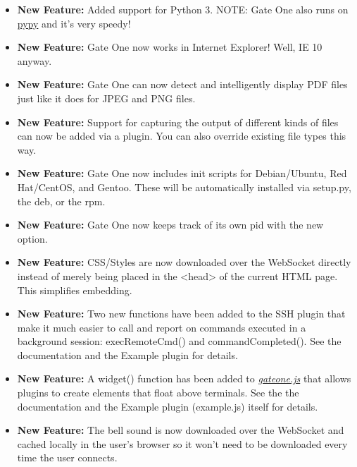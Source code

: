 \documentclass[letterpaper,10pt,openany]{sphinxmanual}
\begin{document}
\begin{itemize}
\item {} 
\textbf{New Feature:}  Added support for Python 3.  NOTE:  Gate One also runs on \href{http://pypy.org/}{pypy} and it's very speedy!

\item {} 
\textbf{New Feature:}  Gate One now works in Internet Explorer!  Well, IE 10 anyway.

\item {} 
\textbf{New Feature:}  Gate One can now detect and intelligently display PDF files just like it does for JPEG and PNG files.

\item {} 
\textbf{New Feature:}  Support for capturing the output of different kinds of files can now be added via a plugin.  You can also override existing file types this way.

\item {} 
\textbf{New Feature:}  Gate One now includes init scripts for Debian/Ubuntu, Red Hat/CentOS, and Gentoo.  These will be automatically installed via setup.py, the deb, or the rpm.

\item {} 
\textbf{New Feature:}  Gate One now keeps track of its own pid with the new  option.

\item {} 
\textbf{New Feature:}  CSS/Styles are now downloaded over the WebSocket directly instead of merely being placed in the \textless{}head\textgreater{} of the current HTML page.  This simplifies embedding.

\item {} 
\textbf{New Feature:}  Two new functions have been added to the SSH plugin that make it much easier to call and report on commands executed in a background session:  execRemoteCmd() and commandCompleted().  See the documentation and the Example plugin for details.

\item {} 
\textbf{New Feature:}  A widget() function has been added to {\hyperref[Developer/js_gateone:gateone-javascript]{\emph{gateone.js}}} that allows plugins to create elements that float above terminals.  See the the documentation and the Example plugin (example.js) itself for details.

\item {} 
\textbf{New Feature:}  The bell sound is now downloaded over the WebSocket and cached locally in the user's browser so it won't need to be downloaded every time the user connects.


\end{itemize}
\end{document}
